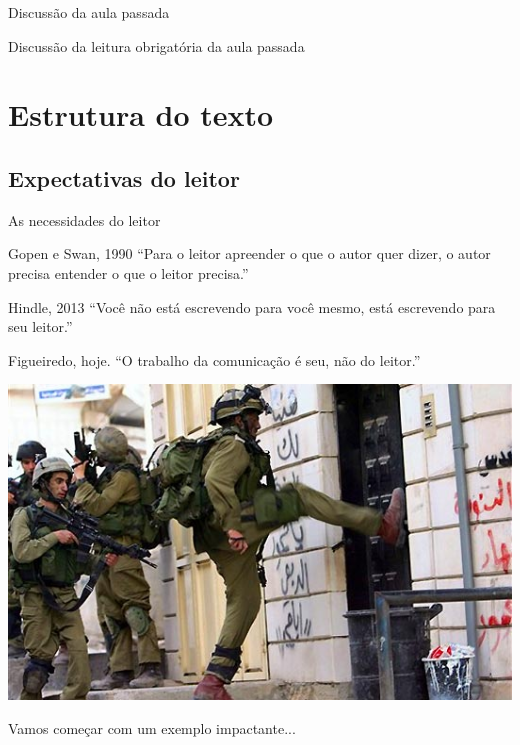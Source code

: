 \documentclass{beamer}
\begin{document}

\begin{frame}{Discussão da aula passada}
  \begin{block}{}
    Discussão da leitura obrigatória da aula passada
  \end{block}
\end{frame}

\section{Estrutura do texto}

\subsection{Expectativas do leitor}

\begin{frame}{As necessidades do leitor}
  \begin{block}{Gopen e Swan, 1990}
    \small
    ``Para o leitor apreender o que o autor quer dizer, o autor
    precisa entender o que o leitor precisa.''
  \end{block}\pause
  \begin{block}{Hindle, 2013}
    \small
    ``Você não está escrevendo para você mesmo, está escrevendo para
    seu leitor.''
  \end{block}\pause
  \begin{block}{Figueiredo, hoje.}
    ``O \alert{trabalho} da comunicação é seu, não do leitor.''
  \end{block}
\end{frame}

\begin{frame}
  \begin{center}
    \includegraphics[width=\textwidth]{Escrita/penaporta}
  \end{center}
  \bigskip
  Vamos começar com um exemplo impactante...
\end{frame}
\end{document}
